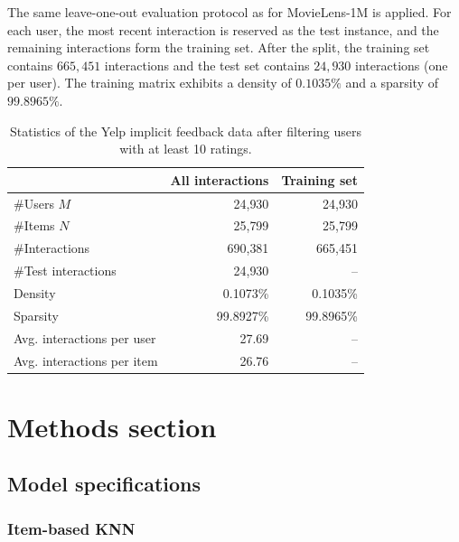 \documentclass[11pt]{article}
\begin{document}
The same leave-one-out evaluation protocol as for MovieLens-1M is applied. For each user, the most recent 
interaction is reserved as the test instance, and the remaining interactions form the training set. After the split, 
the training set contains $665{,}451$ interactions and the test set contains $24{,}930$ interactions (one per user). 
The training matrix exhibits a density of $0.1035\%$ and a sparsity of $99.8965\%$.

\begin{table}[t]
    \centering
    \caption{Statistics of the Yelp implicit feedback data after filtering users with at least 10 ratings.}
    \label{tab:yelp_stats}
    \begin{tabular}{lrr}
        \toprule
        & \multicolumn{1}{c}{All interactions} & \multicolumn{1}{c}{Training set} \\
        \midrule
        \#Users $M$                     & 24{,}930        & 24{,}930        \\
        \#Items $N$                     & 25{,}799        & 25{,}799        \\
        \#Interactions                  & 690{,}381       & 665{,}451       \\
        \#Test interactions             & 24{,}930        & --              \\
        Density                         & 0.1073\%        & 0.1035\%        \\
        Sparsity                        & 99.8927\%       & 99.8965\%       \\
        Avg. interactions per user      & 27.69           & --              \\
        Avg. interactions per item      & 26.76           & --              \\
        \bottomrule
    \end{tabular}
\end{table}

\section{Methods section}


\subsection{Model specifications}

\subsubsection{Item-based KNN}
\end{document}
